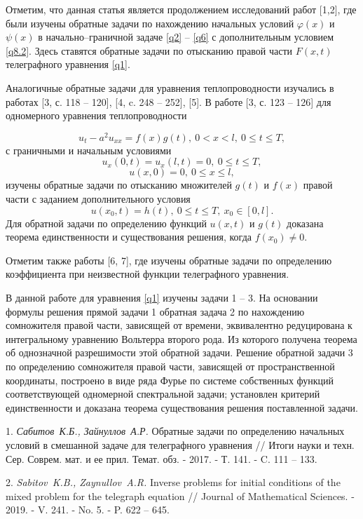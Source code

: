Отметим, что данная статья является продолжением исследований работ [1,2], где были изучены обратные задачи по нахождению начальных условий $\varphi(x)$ и $\psi(x)$ в начально--граничной задаче \eqref{q2} -- \eqref{q6} с дополнительным условием \eqref{q8.2}. Здесь ставятся обратные задачи по отысканию правой части $F(x,t)$ телеграфного уравнения \eqref{q1}.

Аналогичные обратные задачи для уравнения теплопроводности изучались в работах [3, с. 118 -- 120], [4, c. 248 -- 252], [5]. В работе [3, с. 123 -- 126] для одномерного уравнения теплопроводности

$$u_t-a^2u_{xx}=f(x)g(t),\ 0<x<l,\ 0\leqslant t\leqslant T,$$
с граничными и начальным условиями
$$u_x(0,t)=u_x(l,t)=0,\ 0\leqslant t\leqslant T,$$
$$u(x,0)=0,\ 0\leqslant x\leqslant l,$$
изучены обратные задачи по отысканию множителей $g(t)$ и $f(x)$ правой части с заданием дополнительного условия
\begin{equation}\label{aa1}u(x_0,t)=h(t),\ 0\leqslant t\leqslant T,\ x_0\in[0,l].\end{equation}
Для обратной задачи по определению функций $u(x,t)$ и $g(t)$ доказана теорема единственности и существования решения, когда $f(x_0)\not=0$.

Отметим также работы [6, 7], где изучены обратные задачи по определению коэффициента при неизвестной функции телеграфного уравнения.

В данной работе для уравнения \eqref{q1} изучены задачи 1 -- 3. На основании формулы решения прямой задачи 1 обратная задача 2 по нахождению сомножителя правой части, зависящей от
времени, эквивалентно редуцирована к интегральному уравнению Вольтерра второго рода. Из которого получена
теорема об однозначной разрешимости этой обратной задачи. Решение обратной задачи 3 по
определению сомножителя правой части, зависящей от пространственной координаты,
построено в виде ряда Фурье по системе собственных функций соответствующей одномерной спектральной задачи; установлен критерий единственности и доказана теорема существования решения поставленной задачи.


\litlist

1. {\it Сабитов~К.Б., Зайнуллов~А.Р.}
 Обратные задачи по определению начальных условий в смешанной задаче для телеграфного уравнения // Итоги науки и техн. Сер. Соврем. мат. и ее прил. Темат. обз. - 2017. - Т. 141. - C. 111 -- 133.

2. {\it Sabitov~K.B., Zaynullov~A.R.} Inverse problems for initial conditions of the mixed problem
 for the telegraph equation // Journal of Mathematical Sciences. - 2019. - V. 241. - No. 5. - P. 622 -- 645.


